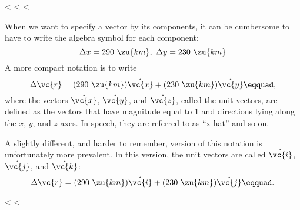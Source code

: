 <%
<%
<%

When we want to specify a vector by its components, it can
be cumbersome to have to write the algebra symbol for each component:
\begin{equation*}
   \Delta x= 290\ \zu{km},\ \Delta y=230\ \zu{km}
\end{equation*}
A more compact notation is to write
\begin{equation*}
        \Delta \vc{r}  =  (290\ \zu{km})\hat{\vc{x}} + (230\ \zu{km})\hat{\vc{y}}\eqquad,
\end{equation*}
where the vectors $\hat{\vc{x}}$, $\hat{\vc{y}}$, and $\hat{\vc{z}}$, called the unit vectors, are
defined as the vectors that have magnitude equal to 1 and
directions lying along the $x$, $y$, and $z$ axes. In speech,
they are referred to as ``x-hat'' and so on.

A slightly different, and harder to remember, version of
this notation is unfortunately more prevalent. In this
version, the unit vectors are called $\hat{\vc{i}}$, $\hat{\vc{j}}$, and $\hat{\vc{k}}$:
\begin{equation*}
        \Delta \vc{r}  =  (290\ \zu{km})\hat{\vc{i}} + (230\ \zu{km})\hat{\vc{j}}\eqquad.
\end{equation*}

<%
<%

